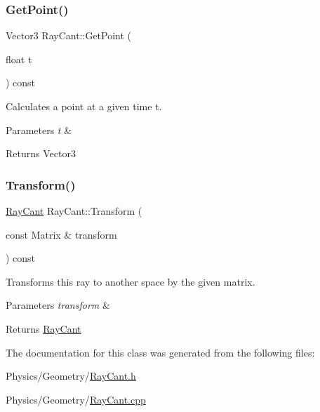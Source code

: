 \subsubsection{\texorpdfstring{Get\+Point()}{GetPoint()}}
{\footnotesize\ttfamily Vector3 Ray\+Cant\+::\+Get\+Point (\begin{DoxyParamCaption}\item[{float}]{t }\end{DoxyParamCaption}) const}



Calculates a point at a given time t. 


\begin{DoxyParams}{Parameters}
{\em t} & \\
\hline
\end{DoxyParams}
\begin{DoxyReturn}{Returns}
Vector3 
\end{DoxyReturn}
\mbox{\label{classRayCant_aa1732faaf14c4cddc76a57d000147eea}} 
\subsubsection{\texorpdfstring{Transform()}{Transform()}}
{\footnotesize\ttfamily \hyperlink{classRayCant}{Ray\+Cant} Ray\+Cant\+::\+Transform (\begin{DoxyParamCaption}\item[{const Matrix \&}]{transform }\end{DoxyParamCaption}) const}



Transforms this ray to another space by the given matrix. 


\begin{DoxyParams}{Parameters}
{\em transform} & \\
\hline
\end{DoxyParams}
\begin{DoxyReturn}{Returns}
\hyperlink{classRayCant}{Ray\+Cant} 
\end{DoxyReturn}


The documentation for this class was generated from the following files\+:\begin{DoxyCompactItemize}
\item 
Physics/\+Geometry/\hyperlink{RayCant_8h}{Ray\+Cant.\+h}\item 
Physics/\+Geometry/\hyperlink{RayCant_8cpp}{Ray\+Cant.\+cpp}\end{DoxyCompactItemize}
